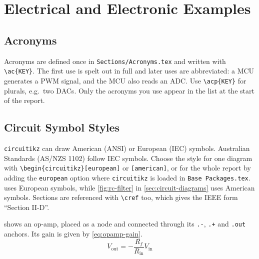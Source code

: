 
\section{Electrical and Electronic Examples}
\label{sec:electrical}

\subsection{Acronyms}

Acronyms are defined once in \texttt{Sections/Acronyms.tex} and written
with \verb|\ac{KEY}|. The first use is spelt out in full and later uses are
abbreviated: a \ac{MCU} generates a \ac{PWM} signal, and the \ac{MCU} also
reads an \ac{ADC}. Use \verb|\acp{KEY}| for plurals, e.g.\ two \acp{DAC}.
Only the acronyms you use appear in the list at the start of the report.

\subsection{Circuit Symbol Styles}

\texttt{circuitikz} can draw American (ANSI) or European (IEC) symbols.
Australian Standards (AS/NZS 1102) follow IEC symbols. Choose the style for
one diagram with \verb|\begin{circuitikz}[european]| or
\verb|[american]|, or for the whole report by adding the \verb|european|
option where \texttt{circuitikz} is loaded in \texttt{Base Packages.tex}.
 uses European symbols, while \cref{fig:rc-filter} in
\cref{sec:circuit-diagrams} uses American symbols. Sections are referenced
with \verb|\cref| too, which gives the IEEE form ``Section II-D''.

 shows an op-amp, placed as a node and connected through
its \verb|.-|, \verb|.+| and \verb|.out| anchors. Its gain is given by
\cref{eq:opamp-gain}.
\begin{equation}
    V_\text{out} = -\frac{R_f}{R_\text{in}} V_\text{in}
    \label{eq:opamp-gain}
\end{equation}

